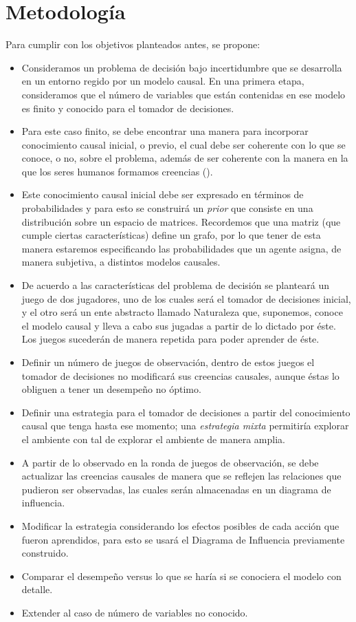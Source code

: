 \documentclass[11pt]{article}
\theoremstyle{plain}
\begin{document}
\section{Metodología}
Para cumplir con los objetivos planteados antes, se propone:
\begin{itemize}
\item Consideramos un problema de decisión bajo incertidumbre que se desarrolla en un entorno regido por un modelo causal. En una primera etapa, consideramos que el número de variables que están contenidas en ese modelo es finito y conocido para el tomador de decisiones.
\item Para este caso finito, se debe encontrar una manera para incorporar conocimiento causal inicial, o previo, el cual debe ser coherente con lo que se conoce, o no, sobre el problema, además de ser coherente con la manera en la que los seres humanos formamos creencias (\cite{larrouy2017mindreading}).
\item Este conocimiento causal inicial debe ser expresado en términos de probabilidades y para esto se construirá un \textit{prior} que consiste en una distribución sobre un espacio de matrices. Recordemos que una matriz (que cumple ciertas características) define un grafo, por lo que tener de esta manera estaremos especificando las probabilidades que un agente asigna, de manera subjetiva, a distintos modelos causales. 
\item De acuerdo a las características del problema de decisión se planteará un juego de dos jugadores, uno de los cuales será el tomador de decisiones inicial, y el otro será un ente abstracto llamado Naturaleza que, suponemos, conoce el modelo causal y lleva a cabo sus jugadas a partir de lo dictado por éste. Los juegos sucederán de manera repetida para poder aprender de éste.
\item Definir un número de juegos de observación, dentro de estos juegos el tomador de decisiones no modificará sus creencias causales, aunque éstas lo obliguen a tener un desempeño no óptimo.
\item Definir una estrategia para el tomador de decisiones a partir del conocimiento causal que tenga hasta ese momento; una \textit{estrategia mixta} permitiría explorar el ambiente con tal de explorar el ambiente de manera amplia.
\item A partir de lo observado en la ronda de juegos de observación, se debe actualizar las creencias causales de manera que se reflejen las relaciones que pudieron ser observadas, las cuales serán almacenadas en un diagrama de influencia.
\item Modificar la estrategia considerando los efectos posibles de cada acción que fueron aprendidos, para esto se usará el Diagrama de Influencia previamente construido. 
\item Comparar el desempeño versus lo que se haría si se conociera el modelo con detalle.
\item Extender al caso de número de variables no conocido.
\end{itemize}


\end{document}
